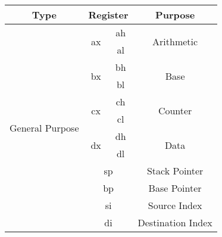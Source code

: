 \documentclass[11pt,a5paper,footinclude=true,headinclude=true]{scrbook} %
\begin{document}
\begin{center}
	\begin{tabular}{|c|c|c|c|}
		\hline
		Type                              & \multicolumn{2}{c|}{Register}            & Purpose\\\hline\hline
		\multirow{16}{*}{General Purpose} & \multirow{2}{*}{ax} & ah                 & \multirow{2}{*}{Arithmetic}\\
		\cline{3-3}
		                                  &                     & al                 &\\
		\cline{2-4}
		                                  & \multirow{2}{*}{bx} & bh                 & \multirow{2}{*}{Base}\\
		\cline{3-3}
		                                  &                     & bl                 &\\
		\cline{2-4}
		                                  & \multirow{2}{*}{cx} & ch                 & \multirow{2}{*}{Counter}\\
		\cline{3-3}
		                                  &                     & cl                 &\\
		\cline{2-4}
		                                  & \multirow{2}{*}{dx} & dh                 & \multirow{2}{*}{Data}\\
		\cline{3-3}
		                                  &                     & dl                 &\\
		\cline{2-4}
		                                  & \multicolumn{2}{c|}{\multirow{2}{*}{sp}} & \multirow{2}{*}{Stack Pointer}\\
		                                  & \multicolumn{2}{c|}{}                    &\\
		\cline{2-4}
		                                  & \multicolumn{2}{c|}{\multirow{2}{*}{bp}} & \multirow{2}{*}{Base Pointer}\\
		                                  & \multicolumn{2}{c|}{}                    &\\
		\cline{2-4}
		                                  & \multicolumn{2}{c|}{\multirow{2}{*}{si}} & \multirow{2}{*}{Source Index}\\
		                                  & \multicolumn{2}{c|}{}                    &\\
		\cline{2-4}
		                                  & \multicolumn{2}{c|}{\multirow{2}{*}{di}} & \multirow{2}{*}{Destination Index}\\
		                                  & \multicolumn{2}{c|}{}                    &\\

\end{tabular}
\end{center}
\end{document}
